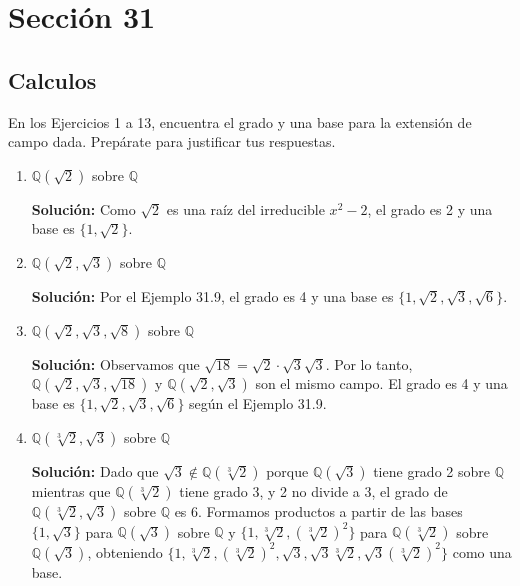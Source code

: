 \section*{Sección 31}

\subsection*{Calculos}
En los Ejercicios 1 a 13, encuentra el grado y una base para la extensión de campo dada. Prepárate para justificar tus respuestas.

\begin{enumerate}
    \item $\mathbb{Q}(\sqrt{2})$ sobre $\mathbb{Q}$
    
    \textbf{Solución:} Como \( \sqrt{2} \) es una raíz del irreducible \( x^2 - 2 \), el grado es 2 y una base es \(\{1, \sqrt{2}\}\).

    \item \( \mathbb{Q}(\sqrt{2}, \sqrt{3}) \) sobre \( \mathbb{Q} \)

    \textbf{Solución:} Por el Ejemplo 31.9, el grado es 4 y una base es \(\{1, \sqrt{2}, \sqrt{3}, \sqrt{6}\}\).

    \item \( \mathbb{Q}(\sqrt{2}, \sqrt{3}, \sqrt{8}) \) sobre \( \mathbb{Q} \)

    \textbf{Solución:} Observamos que \( \sqrt{18} = \sqrt{2} \cdot \sqrt{3} \sqrt{3} \). Por lo tanto, \( \mathbb{Q}(\sqrt{2}, \sqrt{3}, \sqrt{18}) \) y \( \mathbb{Q}(\sqrt{2}, \sqrt{3}) \) son el mismo campo. El grado es 4 y una base es \(\{1, \sqrt{2}, \sqrt{3}, \sqrt{6}\}\) según el Ejemplo 31.9.

    \item \( \mathbb{Q}(\sqrt[3]{2}, \sqrt{3}) \) sobre \( \mathbb{Q} \)

    \textbf{Solución:} Dado que \( \sqrt{3} \notin \mathbb{Q}(\sqrt[3]{2}) \) porque \( \mathbb{Q}(\sqrt{3}) \) tiene grado 2 sobre \( \mathbb{Q} \) mientras que \( \mathbb{Q}(\sqrt[3]{2}) \) tiene grado 3, y 2 no divide a 3, el grado de \( \mathbb{Q}(\sqrt[3]{2}, \sqrt{3}) \) sobre \( \mathbb{Q} \) es 6. Formamos productos a partir de las bases \(\{1, \sqrt{3}\}\) para \( \mathbb{Q}(\sqrt{3}) \) sobre \( \mathbb{Q} \) y \(\{1, \sqrt[3]{2}, (\sqrt[3]{2})^2\}\) para \( \mathbb{Q}(\sqrt[3]{2}) \) sobre \( \mathbb{Q}(\sqrt{3})\), obteniendo \(\{1, \sqrt[3]{2}, (\sqrt[3]{2})^2, \sqrt{3}, \sqrt{3}\sqrt[3]{2}, \sqrt{3}(\sqrt[3]{2})^2\}\) como una base.


\end{enumerate}
